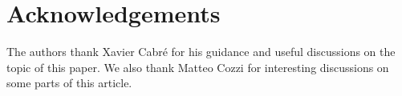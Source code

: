 \documentclass[12pt,reqno]{amsart}
\theoremstyle{definition}
\theoremstyle{remark}
\numberwithin{equation}{section}
\begin{document}
\section*{Acknowledgements}

The authors thank Xavier Cabré for his guidance and useful discussions on the topic of this paper. We also thank Matteo Cozzi for interesting discussions on some parts of this article.





\end{document}
